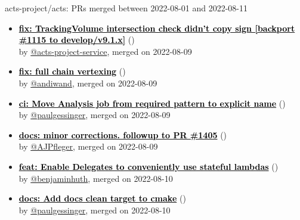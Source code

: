 \begin{frame}[allowframebreaks]{ acts-project/acts: PRs merged 
between 2022-08-01 and 2022-08-11
}
\begin{itemize}
    \item\prmerged\textbf{\href{https://github.com/acts-project/acts/pull/1383}{\textcolor{black}{fix: TrackingVolume intersection check didn't copy sign [backport \#1115 to develop/v9.1.x]}}}
    (\href{https://github.com/acts-project/acts/pull/1383}{}) \\
    by \href{https://github.com/acts-project-service}{@acts-project-service}, merged on 2022-08-09

    \item\prmerged\textbf{\href{https://github.com/acts-project/acts/pull/1299}{\textcolor{black}{fix: full chain vertexing}}}
    (\href{https://github.com/acts-project/acts/pull/1299}{}) \\
    by \href{https://github.com/andiwand}{@andiwand}, merged on 2022-08-09

    \item\prmerged\textbf{\href{https://github.com/acts-project/acts/pull/1411}{\textcolor{black}{ci: Move Analysis job from required pattern to explicit name}}}
    (\href{https://github.com/acts-project/acts/pull/1411}{}) \\
    by \href{https://github.com/paulgessinger}{@paulgessinger}, merged on 2022-08-09

    \item\prmerged\textbf{\href{https://github.com/acts-project/acts/pull/1407}{\textcolor{black}{docs: minor corrections. followup to PR \#1405}}}
    (\href{https://github.com/acts-project/acts/pull/1407}{}) \\
    by \href{https://github.com/AJPfleger}{@AJPfleger}, merged on 2022-08-09

    \item\prmerged\textbf{\href{https://github.com/acts-project/acts/pull/1410}{\textcolor{black}{feat: Enable Delegates to conveniently use stateful lambdas}}}
    (\href{https://github.com/acts-project/acts/pull/1410}{}) \\
    by \href{https://github.com/benjaminhuth}{@benjaminhuth}, merged on 2022-08-10

    \item\prmerged\textbf{\href{https://github.com/acts-project/acts/pull/1393}{\textcolor{black}{docs: Add docs clean target to cmake}}}
    (\href{https://github.com/acts-project/acts/pull/1393}{}) \\
    by \href{https://github.com/paulgessinger}{@paulgessinger}, merged on 2022-08-10


\end{itemize}
\end{frame}
